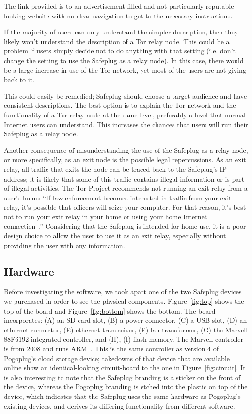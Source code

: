 \documentclass[conference]{IEEEtran}
\begin{document}
The link provided is to an advertisement-filled and not particularly reputable-looking website with no clear navigation to get to the necessary instructions.  

If the majority of users can only understand the simpler description, then they likely won't understand the description of a Tor relay node.  This could be a problem if users simply decide not to do anything with that setting (i.e. don't change the setting to use the Safeplug as a relay node).  In this case, there would be a large increase in use of the Tor network, yet most of the users are not giving back to it.

This could easily be remedied; Safeplug should choose a target audience and have consistent descriptions.  The best option is to explain the Tor network and the functionality of a Tor relay node at the same level, preferably a level that normal Internet users can understand.  This increases the chances that users will run their Safeplug as a relay node.

Another consequence of misunderstanding the use of the Safeplug as a relay node, or more specifically, as an exit node is the possible legal repercussions.  As an exit relay, all traffic that exits the node can be traced back to the Safeplug's IP address; it is likely that some of this traffic contains illegal information or is part of illegal activities.  The Tor Project recommends not running an exit relay from a user's home: ``If law enforcement becomes interested in traffic from your exit relay, it's possible that officers will seize your computer. For that reason, it's best not to run your exit relay in your home or using your home Internet connection~\cite{law}.''  Considering that the Safeplug is intended for home use, it is a poor design choice to allow the user to use it as an exit relay, especially without providing the user with any information.

\subsection{Hardware}
Before investigating the software, we took apart one of the two Safeplug devices we purchased in order to see the physical components.  Figure~\ref{fig:top} shows the top of the board and Figure~\ref{fig:bottom} shows the bottom.  The board incorporates: (A) an SD card slot, (B) a power connector, (C) a USB slot, (D) an ethernet connector, (E) ethernet transceiver, (F) lan transformer, (G) the Marvell 88F6192 integrated controller, and (H), (I) flash memory.  The Marvell controller is from 2008 and runs ARM~\cite{marvellhw}. This is the same controller as version 4 of Pogoplug's cloud storage device; takedowns of that device that are available online show an identical-looking circuit-board to the one in Figure~\ref{fig:circuit}\cite{pogo4}.  It is also interesting to note that the Safeplug branding is a sticker on the front of the device, whereas the Pogoplug branding is etched into the plastic on top of the device, which indicates that the Safeplug uses the same hardware as Pogoplug's existing devices, and derives its differing functionality from different software.
\end{document}
